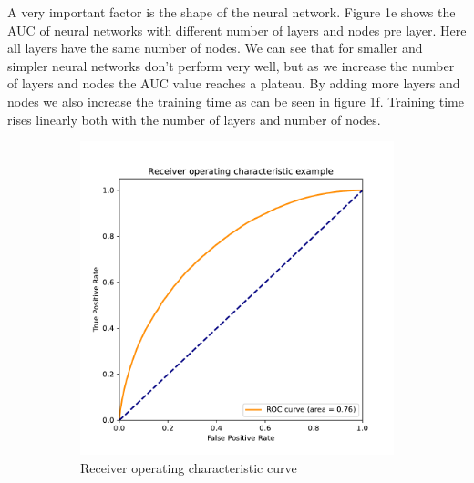 \documentclass[12pt, a4paper]{article}
\begin{document}
A very important factor is the shape of the neural network. Figure 1e shows the AUC of neural networks with different number of layers and nodes pre layer. Here all layers have the same number of nodes. We can see that for smaller and simpler neural networks don't perform very well, but as we increase the number of layers and nodes the AUC value reaches a plateau. By adding more layers and nodes we also increase the training time as can be seen in figure 1f. Training time rises linearly both with the number of layers and number of nodes.

\begin{figure}[h!]
  \begin{subfigure}{0.5\textwidth}
  \includegraphics[width=\linewidth]{../graphs/roc-curve.pdf}
  \caption{Receiver operating characteristic curve} \label{fig:a}
  \end{subfigure}
  \hspace*{\fill}
  \begin{subfigure}{0.5\textwidth}

\end{subfigure}
\end{figure}
\end{document}
